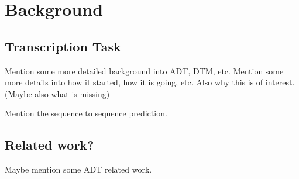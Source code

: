 \chapter{Background}

\section{Transcription Task}

Mention some more detailed background into \gls{ADT}, \gls{DTM}, etc.
Mention some more details into how it started, how it is going, etc.
Also why this is of interest. (Maybe also what is missing)

Mention the sequence to sequence prediction.

\section{Related work?}

Maybe mention some \gls{ADT} related work.